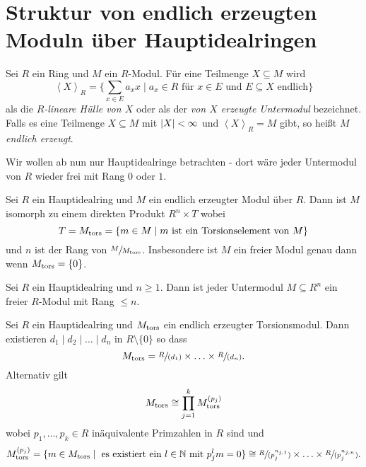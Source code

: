 \section{Struktur von endlich erzeugten Moduln über Hauptidealringen}

\begin{definition}
	Sei $R$ ein Ring und $M $ ein $R$-Modul.
	Für eine Teilmenge $X \subseteq M$ wird
	\[
	\left< X \right>_{R} = \{\sum_{x \in E} a_{x} x \mid a_{x} \in R \text{ für $x \in E$ und $E \subseteq X$ endlich}\} 
	\]
	als die \emph{$R$-lineare Hülle von $X$} oder als der \emph{von $X$ erzeugte Untermodul} bezeichnet.
	Falls es eine Teilmenge $X \subseteq M$ mit $\abs{X} < \infty$ und $\left< X \right>_{R} = M$ gibt, so heißt $M$ \emph{endlich erzeugt}.
\end{definition}


Wir wollen ab nun nur Hauptidealringe betrachten - dort wäre jeder Untermodul von $R$ wieder frei mit Rang $0$ oder $1$.

\begin{theorem}
	Sei $R$ ein Hauptidealring und $M$ ein endlich erzeugter Modul über $R$.
	Dann ist $M$ isomorph zu einem direkten Produkt $R^{n} \times T$ wobei
	\[
		T = M_{\operatorname{tors}} = \{m \in M \mid m \text{ ist ein Torsionselement von } M\}
	\]
	und $n$ ist der Rang von $\sfrac{M}{M_{\operatorname{tors}}}$.
	Insbesondere ist $M$ ein freier Modul genau dann wenn $M_{\operatorname{tors}} = \{0\}$.
\end{theorem}

\begin{proposition}
	Sei $R$ ein Hauptidealring und $n \geq 1$. Dann ist jeder Untermodul $M \subseteq R^{n}$ ein freier $R$-Modul mit Rang $\leq n$.
\end{proposition}



\begin{theorem}
	Sei $R$ ein Hauptidealring und $M_{\operatorname{tors}}$ ein endlich erzeugter Torsionsmodul. 
	Dann existieren $d_1 \mid d_2 \mid \ldots \mid d_{n}$ in $R \setminus \{0\} $ so dass
	\[
		M_{\operatorname{tors}} = \sfrac{R}{(d_1)} \times \ldots \times \sfrac{R}{(d_{n})}
	.\] 
	Alternativ gilt
	\[
		M_{\operatorname{tors}} \cong \prod_{j=1}^{k} M_{\operatorname{tors}}^{(p_{j})}
	\]
	wobei $p_1,\ldots,p_{k} \in R$ inäquivalente Primzahlen in $R$ sind und
	\[
		M_{\operatorname{tors}}^{(p_{j})} = \{m \in M_{\operatorname{tors}} \mid \text{ es existiert ein $l \in \mathbb{N}$ mit } p_{j}^{l} m = 0\} \cong 
		\sfrac{R}{(p_{j}^{n_{j,1}})} \times \ldots \times \sfrac{R}{(p_{j}^{n_{j,n}})}
	.\] 
\end{theorem}

